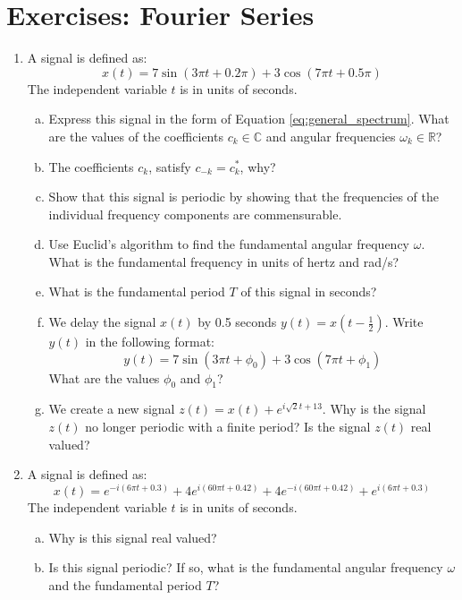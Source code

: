 \newpage
\section{Exercises: Fourier Series}

\begin{enumerate}
\item A signal is defined as:
\begin{equation}
    x(t) = 7 \sin(3 \pi t + 0.2\pi) + 3 \cos(7 \pi t + 0.5\pi)  
\end{equation}
The independent variable $t$ is in units of seconds. 
\begin{enumerate}[a)]
    \item Express this signal in the form of Equation \ref{eq:general_spectrum}. What are the values of the coefficients $c_k \in \mathbb{C}$ and angular frequencies $\omega_k \in \mathbb{R}$?
    \item The coefficients $c_{k}$, satisfy $c_{-k}=c_{k}^{*}$, why?
    \item Show that this signal is periodic by showing that the frequencies of the individual frequency components are commensurable.
    \item Use Euclid's algorithm to find the fundamental angular frequency $\omega$. What is the fundamental frequency in units of hertz and rad/s?
    \item What is the fundamental period $T$ of this signal in seconds?
    \item We delay the signal $x(t)$ by 0.5 seconds $y(t) = x(t-\frac{1}{2})$. Write $y(t)$ in the following format:
\begin{equation}
    y(t) = 7 \sin(3\pi t + \phi_0) + 3 \cos(7\pi t + \phi_1)
\end{equation}
What are the values $\phi_0$ and $\phi_1$?
\item We create a new signal $z(t) = x(t) + e^{i \sqrt{2} t + 13}$. Why is the signal $z(t)$ no longer periodic with a finite period? Is the signal $z(t)$ real valued?
\end{enumerate}

\item A signal is defined as:
  \begin{equation}
    x(t) = e^{-i (6\pi  t + 0.3)}  + 4e^{i (60\pi  t + 0.42)} + 4e^{-i (60\pi t + 0.42)}  + e^{i (6\pi t + 0.3)} 
  \end{equation}
  The independent variable $t$ is in units of seconds. 
  \begin{enumerate}[a)]
  \item Why is this signal real valued?
    \item Is this signal periodic? If so, what is the fundamental angular frequency $\omega$ and the fundamental period $T$?
   \end{enumerate}



\end{enumerate}
